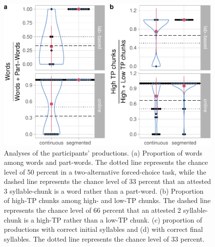 \documentclass[
]{article}
\begin{document}
\begin{figure}

{\centering \includegraphics[width=0.8\linewidth]{segmentation_recall_combined_for_revision3_files/figure-latex/recall-w-pw-chunks-positions-plot-wpw-chunks-1} 

}

\caption{Analyses of the participants' productions. (a) Proportion of words among words and part-words. The dotted line represents the chance level of 50 percent in a two-alternative forced-choice task, while the dashed line represents the chance level of 33 percent that an attested 3 syllable-chunk is a word rather than a part-word. (b) Proportion of high-TP chunks among high- and low-TP chunks. The dashed line represents the chance level of 66 percent that an attested 2 syllable-chunk is a high-TP rather than a low-TP chunk. (c) proportion of productions with correct initial syllables and (d) with correct final syllables. The dotted line represents the chance level of 33 percent.}\label{fig:recall-w-pw-chunks-positions-plot-wpw-chunks}
\end{figure}
\end{document}

